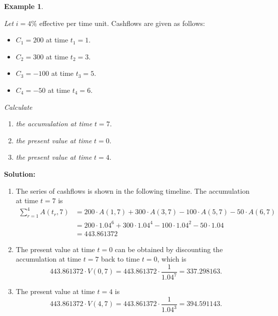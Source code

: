 \documentclass[
]{book}
\theoremstyle{definition}
\theoremstyle{definition}
\newtheorem{example}{Example}[chapter]
\theoremstyle{definition}
\theoremstyle{definition}
\theoremstyle{remark}
\begin{document}
\begin{example}
\protect\hypertarget{exm:unlabeled-div-24}{}\label{exm:unlabeled-div-24}

\emph{Let} \(i = 4\%\) effective per time unit. Cashflows are given as follows:

\begin{itemize}
\item
  \(C_1 = 200\) at time \(t_1 = 1\).
\item
  \(C_2 = 300\) at time \(t_2 = 3\).
\item
  \(C_3 = -100\) at time \(t_3 = 5\).
\item
  \(C_4 = -50\) at time \(t_4 = 6\).
\end{itemize}

\emph{Calculate}

\begin{enumerate}
\def\labelenumi{\arabic{enumi}.}
\item
  \emph{the accumulation at time} \(t = 7\).
\item
  \emph{the present value at time} \(t = 0\).
\item
  \emph{the present value at time} \(t = 4\).
\end{enumerate}

\end{example}

\textbf{Solution:}

\begin{enumerate}
\def\labelenumi{\arabic{enumi}.}
\item
  The series of cashflows is shown in the following timeline. The
  accumulation at time \(t = 7\) is \[\begin{aligned}
      \sum_{r=1}^4 A(t_r,7) &= 200 \cdot A(1,7) +  300 \cdot A(3,7) -  100 \cdot A(5,7) -  50 \cdot A(6,7) \\
      &= 200 \cdot 1.04^6 + 300 \cdot 1.04^4 - 100 \cdot 1.04^2 - 50 \cdot 1.04 \\
      & = 443.861372\end{aligned}\]
\item
  The present value at time \(t = 0\) can be obtained by discounting the
  accumulation at time \(t = 7\) back to time \(t = 0\), which is
  \[443.861372  \cdot V(0,7) = 443.861372  \cdot \frac{1}{1.04^7} = 337.298163.\]
\item
  The present value at time \(t = 4\) is
  \[443.861372  \cdot V(4,7) = 443.861372  \cdot \frac{1}{1.04^3} = 394.591143.\]
\end{enumerate}
\end{document}
